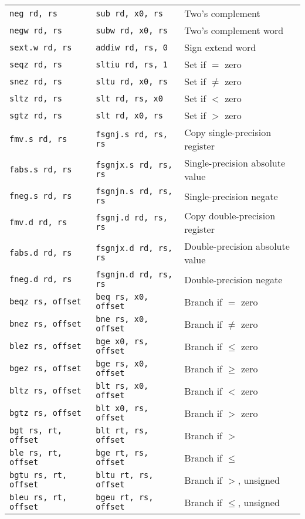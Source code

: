 \begin{table}[h]
\begin{small}
\begin{center}
\begin{tabular}{l l l}
{\tt neg rd, rs} & {\tt sub rd, x0, rs} & Two's complement \\
{\tt negw rd, rs} & {\tt subw rd, x0, rs} & Two's complement word \\
{\tt sext.w rd, rs} & {\tt addiw rd, rs, 0} & Sign extend word \\
{\tt seqz rd, rs} & {\tt sltiu rd, rs, 1} & Set if $=$ zero \\
{\tt snez rd, rs} & {\tt sltu rd, x0, rs} & Set if $\neq$ zero \\
{\tt sltz rd, rs} & {\tt slt rd, rs, x0} & Set if $<$ zero \\
{\tt sgtz rd, rs} & {\tt slt rd, x0, rs} & Set if $>$ zero \\
\hline
{\tt fmv.s rd, rs} & {\tt fsgnj.s rd, rs, rs} & Copy single-precision register \\
{\tt fabs.s rd, rs} & {\tt fsgnjx.s rd, rs, rs} & Single-precision absolute value \\
{\tt fneg.s rd, rs} & {\tt fsgnjn.s rd, rs, rs} & Single-precision negate \\
{\tt fmv.d rd, rs} & {\tt fsgnj.d rd, rs, rs} & Copy double-precision register \\
{\tt fabs.d rd, rs} & {\tt fsgnjx.d rd, rs, rs} & Double-precision absolute value \\
{\tt fneg.d rd, rs} & {\tt fsgnjn.d rd, rs, rs} & Double-precision negate \\
\hline
{\tt beqz rs, offset} & {\tt beq rs, x0, offset} & Branch if $=$ zero \\
{\tt bnez rs, offset} & {\tt bne rs, x0, offset} & Branch if $\neq$ zero \\
{\tt blez rs, offset} & {\tt bge x0, rs, offset} & Branch if $\leq$ zero \\
{\tt bgez rs, offset} & {\tt bge rs, x0, offset} & Branch if $\geq$ zero \\
{\tt bltz rs, offset} & {\tt blt rs, x0, offset} & Branch if $<$ zero \\
{\tt bgtz rs, offset} & {\tt blt x0, rs, offset} & Branch if $>$ zero \\
\hline
{\tt bgt rs, rt, offset} & {\tt blt rt, rs, offset} & Branch if $>$ \\
{\tt ble rs, rt, offset} & {\tt bge rt, rs, offset} & Branch if $\leq$ \\
{\tt bgtu rs, rt, offset} & {\tt bltu rt, rs, offset} & Branch if $>$, unsigned \\
{\tt bleu rs, rt, offset} & {\tt bgeu rt, rs, offset} & Branch if $\leq$, unsigned \\

\end{tabular}
\end{center}
\end{small}
\end{table}
